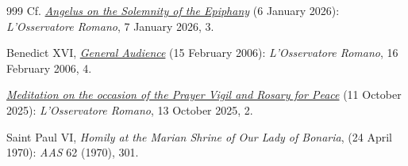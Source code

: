 \documentclass{article}
\begin{document}
\begin{thebibliography}{999}
 Cf. \href{https://www.vatican.va/content/leo-xiv/en/angelus/2026/documents/20260106-angelus.html}{\emph{Angelus on the Solemnity of the Epiphany}} (6 January 2026): \emph{L'Osservatore Romano}, 7 January 2026, 3.

 Benedict XVI, \href{https://www.vatican.va/content/benedict-xvi/en/audiences/2006/documents/hf_ben-xvi_aud_20060215.html}{\emph{General Audience}} (15 February 2006): \emph{L'Osservatore Romano}, 16 February 2006, 4.

 \emph{\href{https://www.vatican.va/content/leo-xiv/en/speeches/2025/october/documents/20251011-veglia-di-preghiera.html}{Meditation on the occasion of the Prayer Vigil and Rosary for Peace}} (11 October 2025): \emph{L'Osservatore Romano}, 13 October 2025, 2.

 Saint Paul VI, \emph{Homily at the Marian Shrine of Our Lady of Bonaria}, (24 April 1970): \emph{AAS} 62 (1970), 301.

\end{thebibliography}
\end{document}
